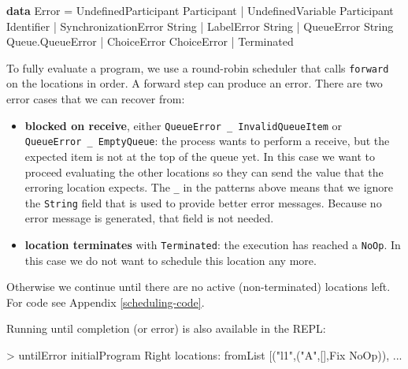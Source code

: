 \documentclass[runningheads,plain]{llncs}
\newenvironment{Shaded}{}{}
\newcommand{\KeywordTok}[1]{\textcolor[rgb]{0.00,0.44,0.13}{\textbf{#1}}}
\newcommand{\DataTypeTok}[1]{\textcolor[rgb]{0.56,0.13,0.00}{#1}}
\newcommand{\StringTok}[1]{\textcolor[rgb]{0.25,0.44,0.63}{#1}}
\newcommand{\FunctionTok}[1]{\textcolor[rgb]{0.02,0.16,0.49}{#1}}
\newcommand{\NormalTok}[1]{#1}
\begin{document}
\begin{Shaded}
\begin{Highlighting}[]
\KeywordTok{data} \DataTypeTok{Error} 
    \FunctionTok{=} \DataTypeTok{UndefinedParticipant} \DataTypeTok{Participant}
    \FunctionTok{|} \DataTypeTok{UndefinedVariable} \DataTypeTok{Participant} \DataTypeTok{Identifier}
    \FunctionTok{|} \DataTypeTok{SynchronizationError} \DataTypeTok{String}
    \FunctionTok{|} \DataTypeTok{LabelError} \DataTypeTok{String}
    \FunctionTok{|} \DataTypeTok{QueueError} \DataTypeTok{String} \DataTypeTok{Queue.QueueError}
    \FunctionTok{|} \DataTypeTok{ChoiceError} \DataTypeTok{ChoiceError}
    \FunctionTok{|} \DataTypeTok{Terminated}
\end{Highlighting}
\end{Shaded}

To fully evaluate a program, we use a round-robin scheduler that calls
\texttt{forward} on the locations in order. A forward step can produce
an error. There are two error cases that we can recover from:

\begin{itemize}
\item
  \textbf{blocked on receive}, either
  \texttt{QueueError\ \_\ InvalidQueueItem} or
  \texttt{QueueError\ \_\ EmptyQueue}: the process wants to perform a
  receive, but the expected item is not at the top of the queue yet. In
  this case we want to proceed evaluating the other locations so they
  can send the value that the erroring location expects. The \texttt{\_}
  in the patterns above means that we ignore the \texttt{String} field
  that is used to provide better error messages. Because no error
  message is generated, that field is not needed.
\item
  \textbf{location terminates} with \texttt{Terminated}: the execution
  has reached a \texttt{NoOp}. In this case we do not want to schedule
  this location any more.
\end{itemize}

Otherwise we continue until there are no active (non-terminated)
locations left. For code see Appendix \ref{scheduling-code}.

Running until completion (or error) is also available in the REPL:

\begin{Shaded}
\begin{Highlighting}[]
\FunctionTok{>}\NormalTok{ untilError initialProgram}
\DataTypeTok{Right}\NormalTok{ locations}\FunctionTok{:}\NormalTok{ fromList [(}\StringTok{"l1"}\NormalTok{,(}\StringTok{"A"}\NormalTok{,[],}\DataTypeTok{Fix} \DataTypeTok{NoOp}\NormalTok{)), }\FunctionTok{...} 
\end{Highlighting}
\end{Shaded}
\end{document}
